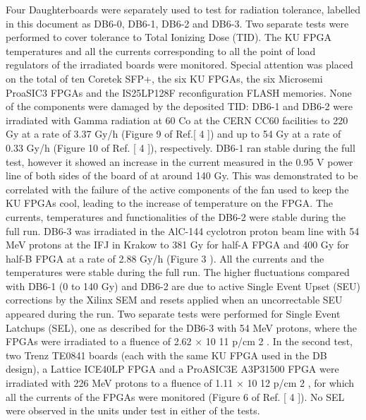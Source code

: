 \documentclass{article}
\begin{document}
Four Daughterboards were separately used to test for radiation tolerance, labelled in this document 
as DB6-0, DB6-1, DB6-2 and DB6-3. 
Two   separate   tests   were   performed   to   cover   tolerance   to   Total   Ionizing   Dose   (TID).   The   KU 
FPGA   temperatures   and   all   the   currents   corresponding   to   all   the   point   of   load   regulators   of   the 
irradiated boards were monitored.   Special attention was placed on the total of ten Coretek SFP+, 
the   six   KU   FPGAs,   the   six   Microsemi   ProaSIC3   FPGAs   and   the   IS25LP128F   reconfiguration 
FLASH   memories.   None   of   the   components   were   damaged   by   the   deposited   TID:   DB6-1   and 
DB6-2   were   irradiated   with   Gamma   radiation   at   60 Co   at   the   CERN   CC60   facilities   to   220   Gy   at 
a   rate   of   3.37   Gy/h   (Figure   9   of   Ref.[ 4 ])   and   up   to   54   Gy   at   a   rate   of   0.33   Gy/h   (Figure   10   of 
Ref.   [ 4 ]),   respectively.   DB6-1   ran   stable   during   the   full   test,   however   it   showed   an   increase   in 
the   current   measured   in   the   0.95   V   power   line   of   both   sides   of   the   board   of   at   around   140   Gy. 
This   was   demonstrated   to   be   correlated   with   the   failure   of   the   active   components   of   the   fan   used 
to   keep   the   KU   FPGAs   cool,   leading   to   the   increase   of   temperature   on   the   FPGA.   The   currents, 
temperatures and functionalities of the DB6-2 were stable during the full run.   DB6-3 was irradiated 
in the AlC-144 cyclotron proton beam line with 54 MeV protons at the IFJ in Krakow to 381 Gy for 
half-A FPGA and 400 Gy for half-B FPGA at a rate of 2.88 Gy/h (Figure  3 ).   All the currents and 
the temperatures were stable during the full run.   The higher fluctuations compared with DB6-1 (0 
to 140 Gy) and DB6-2 are due to active Single Event Upset (SEU) corrections by the Xilinx SEM 
and resets applied when an uncorrectable SEU appeared during the run. 
Two separate tests were performed for Single Event Latchups (SEL), one as described for the 
DB6-3 with 54 MeV protons, where the FPGAs were irradiated to a fluence of 2.62  $\times$ 10 11   p/cm 2 .   In 
the second test, two Trenz TE0841 boards (each with the same KU FPGA used in the DB design), a 
Lattice ICE40LP FPGA and a ProASIC3E A3P31500 FPGA were irradiated with 226 MeV protons 
to a fluence of 1.11  $\times$ 10 12   p/cm 2 , for which all the currents of the FPGAs were monitored (Figure 
6 of Ref.   [ 4 ]).   No SEL were observed in the units under test in either of the tests. 
\end{document}

